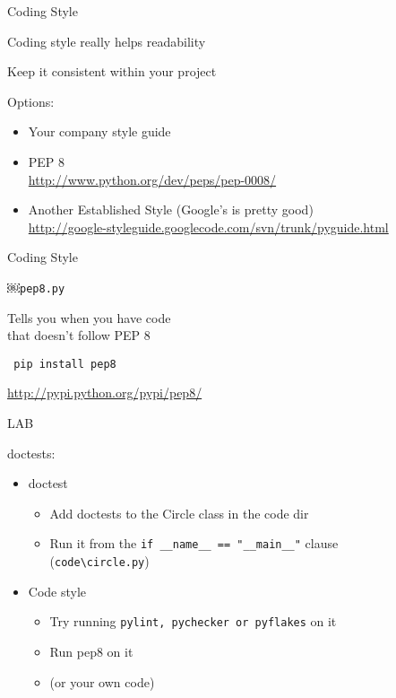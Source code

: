 \documentclass{beamer}
\begin{document}
\begin{frame}[fragile]{Coding Style}

{\Large Coding style really helps readability}

Keep it consistent within your project

\vfill

{\Large Options:}
\begin{itemize}
  \item Your company style guide

  \item PEP 8 \\
        \url{http://www.python.org/dev/peps/pep-0008/}

  \item Another Established Style (Google's is pretty good) \\
        \url{http://google-styleguide.googlecode.com/svn/trunk/pyguide.html}
\end{itemize}

\end{frame} 

\begin{frame}[fragile]{Coding Style}


{\LARGE￼\verb|pep8.py|}

\vfill
{\Large Tells you when you have code \\
        that doesn't follow PEP 8}

\vfill
{\large \verb| pip install pep8 | }

\vfill
\url{http://pypi.python.org/pypi/pep8/}

\end{frame} 



\begin{frame}[fragile]{LAB}

{\Large doctests:}

\begin{itemize}
  \item doctest
    \begin{itemize}
       \item Add doctests to the Circle class in the code dir
       \item Run it from the \verb|if __name__ == "__main__"| clause\\
             (\verb|code\circle.py|)
    \end{itemize}
  \item Code style
    \begin{itemize}
       \item Try running \verb|pylint, pychecker or pyflakes| on it 
       \item Run pep8 on it
       \item (or your own code)
    \end{itemize}

\end{itemize}

\end{frame}
\end{document}

